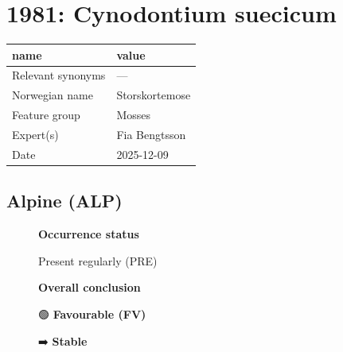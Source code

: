 \documentclass[
  10pt,
  letterpaper,
  DIV=11,
  numbers=noendperiod]{scrartcl}
\author{}
\date{}
\begin{document}
\section{1981: Cynodontium suecicum}\label{cynodontium-suecicum}

\begin{table}
\fontsize{12.0pt}{14.0pt}\selectfont
\begin{tabular*}{\linewidth}{@{\extracolsep{\fill}}ll}
\toprule
name & value \\ 
\midrule\addlinespace[2.5pt]
Relevant synonyms & --- \\ 
Norwegian name & Storskortemose \\ 
Feature group & Mosses \\ 
Expert(s) & Fia Bengtsson \\ 
Date & 2025-12-09 \\ 
\bottomrule
\end{tabular*}
\end{table}

\subsection{Alpine (ALP)}\label{alpine-alp}

\begin{figure}

\begin{minipage}{0.33\linewidth}
\textbf{Occurrence status}\end{minipage}%
%
\begin{minipage}{0.44\linewidth}
Present regularly (PRE)\end{minipage}%
%
\begin{minipage}{0.22\linewidth}
\end{minipage}%

\end{figure}%

\begin{figure}

\begin{minipage}{0.33\linewidth}
\textbf{Overall conclusion}\end{minipage}%
%
\begin{minipage}{0.44\linewidth}
🟢 \textbf{Favourable (FV)}\end{minipage}%
%
\begin{minipage}{0.22\linewidth}
➡️ \textbf{Stable}\end{minipage}%

\end{figure}%
\end{document}
